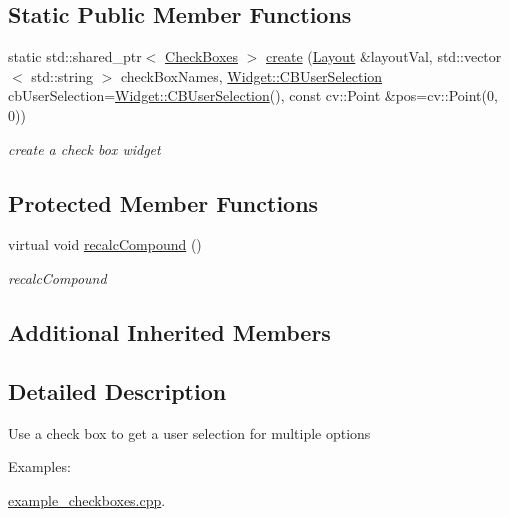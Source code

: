 \subsection*{Static Public Member Functions}
\begin{DoxyCompactItemize}
\item 
static std\+::shared\+\_\+ptr$<$ \hyperlink{classcanvascv_1_1CheckBoxes}{Check\+Boxes} $>$ \hyperlink{classcanvascv_1_1CheckBoxes_a5108f52385a5cb19ad7fe52a18a91df0}{create} (\hyperlink{classcanvascv_1_1Layout}{Layout} \&layout\+Val, std\+::vector$<$ std\+::string $>$ check\+Box\+Names, \hyperlink{classcanvascv_1_1Widget_a977cbd39cf203c5866f07f3645c7e4bc}{Widget\+::\+C\+B\+User\+Selection} cb\+User\+Selection=\hyperlink{classcanvascv_1_1Widget_a977cbd39cf203c5866f07f3645c7e4bc}{Widget\+::\+C\+B\+User\+Selection}(), const cv\+::\+Point \&pos=cv\+::\+Point(0, 0))
\begin{DoxyCompactList}\small\item\em create a check box widget \end{DoxyCompactList}\end{DoxyCompactItemize}
\subsection*{Protected Member Functions}
\begin{DoxyCompactItemize}
\item 
virtual void \hyperlink{classcanvascv_1_1CheckBoxes_a50cae1ae73c9d69f864bc7fe6d6fedd6}{recalc\+Compound} ()
\begin{DoxyCompactList}\small\item\em recalc\+Compound \end{DoxyCompactList}\end{DoxyCompactItemize}
\subsection*{Additional Inherited Members}


\subsection{Detailed Description}
Use a check box to get a user selection for multiple options \begin{Desc}
\item[Examples\+: ]\par
\hyperlink{example_checkboxes_8cpp-example}{example\+\_\+checkboxes.\+cpp}.\end{Desc}


